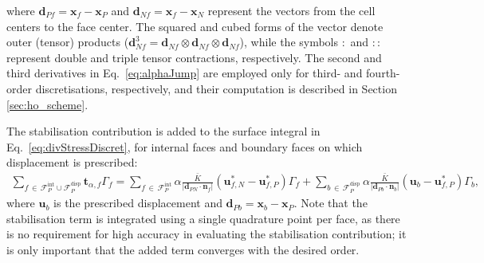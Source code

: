 \documentclass[review,3p]{elsarticle}
\newcommand{\bb}{\boldsymbol}
\begin{document}
where $\bb{d}_{Pf} = \bb{x}_f - \bb{x}_P$ and $\bb{d}_{Nf} = \bb{x}_f - \bb{x}_N$ represent the vectors from the cell centers to the face center.
The squared and cubed forms of the vector denote outer (tensor) products ($\bb{d}_{Nf}^3=\bb{d}_{Nf}\otimes \bb{d}_{Nf} \otimes  \bb{d}_{Nf}$), while the symbols $:$ and $\!::\!$ represent double and triple tensor contractions, respectively.
The second and third derivatives in Eq.~\eqref{eq:alphaJump} are employed only for third- and fourth-order discretisations, respectively, and their computation is described in Section \ref{sec:ho_scheme}.

The stabilisation contribution is added to the surface integral in Eq.~\eqref{eq:divStressDiscret}, for internal faces and boundary faces on which displacement is prescribed:
\begin{eqnarray}
	\sum_{f \,\in\, \mathcal{F}_P^{\text{int}} \cup \mathcal{F}_P^{\text{disp}}} \bb{t}_{\alpha, f} \Gamma_f =
	\sum_{f \,\in\, \mathcal{F}_P^{\text{int}}}  \alpha \frac{\bar{K}}{|\bb{d}_{PN} \cdot \bb{n}_f|}(\bb{u}_{f,N}^*-\bb{u}_{f,P}^*)\Gamma_f
	+
	\sum_{b \,\in\, \mathcal{F}_P^{\text{disp}}}  \alpha \frac{\bar{K}}{|\bb{d}_{Pb} \cdot \bb{n}_b|}(\bb{u}_{b}-\bb{u}_{f,P}^*)\Gamma_b,
\end{eqnarray}
where $\bb{u}_{b}$ is the prescribed displacement and $\bb{d}_{Pb}=\bb{x}_b - \bb{x}_P$. Note that the stabilisation term is integrated using a single quadrature point per face, as there is no requirement for high accuracy in evaluating the stabilisation contribution; it is only important that the added term converges with the desired order.
%
\end{document}

